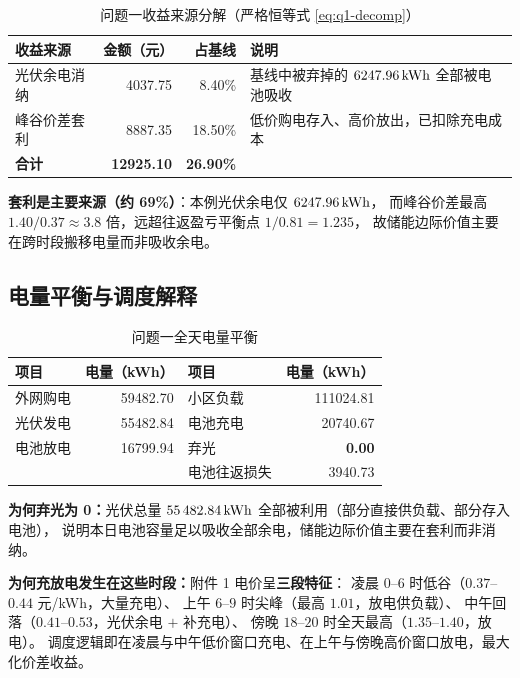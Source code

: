 \begin{table}[H]
\centering
\small
\caption{问题一收益来源分解（严格恒等式 \eqref{eq:q1-decomp}）}
\label{tab:q1-gain}
\begin{tabularx}{\textwidth}{@{}l r r X@{}}
\toprule
收益来源 & {金额（元）} & {占基线} & 说明 \\
\midrule
光伏余电消纳 & 4037.75 & 8.40\% & 基线中被弃掉的 $6247.96\,\text{kWh}$ 全部被电池吸收 \\
峰谷价差套利 & 8887.35 & 18.50\% & 低价购电存入、高价放出，已扣除充电成本 \\
\midrule
\textbf{合计} & \bfseries 12925.10 & \bfseries 26.90\% & \\
\bottomrule
\end{tabularx}
\end{table}

\textbf{套利是主要来源（约 69\%）}：本例光伏余电仅 $6247.96\,\text{kWh}$，
而峰谷价差最高 $1.40/0.37\approx 3.8$ 倍，远超往返盈亏平衡点 $1/0.81=1.235$，
故储能边际价值主要在跨时段搬移电量而非吸收余电。

\subsection{电量平衡与调度解释}

\begin{table}[H]
\centering
\caption{问题一全天电量平衡}
\begin{tabular}{@{}l r l r@{}}
\toprule
项目 & {电量（kWh）} & 项目 & {电量（kWh）} \\
\midrule
外网购电   & 59482.70 & 小区负载     & 111024.81 \\
光伏发电   & 55482.84 & 电池充电     & 20740.67 \\
电池放电   & 16799.94 & 弃光         & \bfseries 0.00 \\
         &          & 电池往返损失 & 3940.73 \\
\bottomrule
\end{tabular}
\end{table}

\textbf{为何弃光为 0：}光伏总量 $55\,482.84\,\text{kWh}$ 全部被利用（部分直接供负载、部分存入电池），
说明本日电池容量足以吸收全部余电，储能边际价值主要在套利而非消纳。

\textbf{为何充放电发生在这些时段：}附件 1 电价呈\textbf{三段特征}：
凌晨 $0$--$6$ 时低谷（$0.37$--$0.44$ 元/kWh，大量充电）、
上午 $6$--$9$ 时尖峰（最高 $1.01$，放电供负载）、
中午回落（$0.41$--$0.53$，光伏余电 $+$ 补充电）、
傍晚 $18$--$20$ 时全天最高（$1.35$--$1.40$，放电）。
调度逻辑即在凌晨与中午低价窗口充电、在上午与傍晚高价窗口放电，最大化价差收益。

